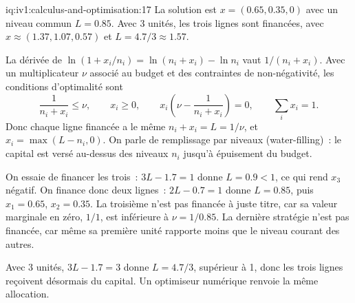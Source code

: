 \begin{solution}{iq:iv1:calculus-and-optimisation:17}
La solution est $x = (0.65, 0.35, 0)$ avec un niveau commun $L = 0.85$. Avec 3 unités, les trois lignes sont financées, avec $x \approx (1.37, 1.07, 0.57)$ et $L = 4.7/3 \approx 1.57$.

La dérivée de $\ln(1 + x_i/n_i) = \ln(n_i + x_i) - \ln n_i$ vaut $1/(n_i + x_i)$. Avec un multiplicateur $\nu$ associé au budget et des contraintes de non-négativité, les conditions d'optimalité sont
\[
\frac{1}{n_i + x_i} \le \nu, \qquad x_i \ge 0, \qquad x_i\left(\nu - \frac{1}{n_i + x_i}\right) = 0, \qquad \sum_i x_i = 1.
\]
Donc chaque ligne financée a le même $n_i + x_i = L = 1/\nu$, et $x_i = \max(L - n_i, 0)$. On parle de remplissage par niveaux (water-filling)~: le capital est versé au-dessus des niveaux $n_i$ jusqu'à épuisement du budget.

On essaie de financer les trois~: $3L - 1.7 = 1$ donne $L = 0.9 < 1$, ce qui rend $x_3$ négatif. On finance donc deux lignes~: $2L - 0.7 = 1$ donne $L = 0.85$, puis $x_1 = 0.65$, $x_2 = 0.35$. La troisième n'est pas financée à juste titre, car sa valeur marginale en zéro, $1/1$, est inférieure à $\nu = 1/0.85$. La dernière stratégie n'est pas financée, car même sa première unité rapporte moins que le niveau courant des autres.

Avec 3 unités, $3L - 1.7 = 3$ donne $L = 4.7/3$, supérieur à 1, donc les trois lignes reçoivent désormais du capital. Un optimiseur numérique renvoie la même allocation.



\end{solution}


